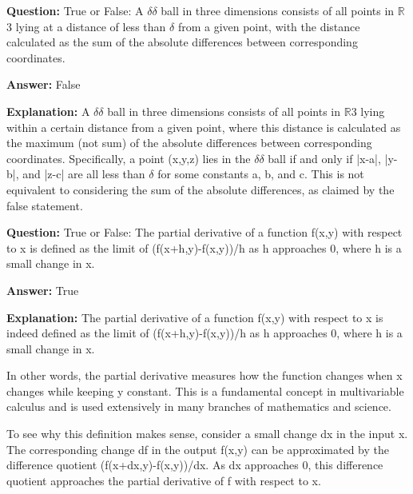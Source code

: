 \documentclass{article}
\begin{document}
                \vspace{0.5cm} 
        
            
                \textbf {Question:} True or False: A \ensuremath{\delta}\ensuremath{\delta} ball in three dimensions consists of all points in \ensuremath{\mathbb{R}}3 lying at a distance of less than \ensuremath{\delta} from a given point, with the distance calculated as the sum of the absolute differences between corresponding coordinates.
                
                \textbf{Answer:} False

                \textbf{Explanation:} A \ensuremath{\delta}\ensuremath{\delta} ball in three dimensions consists of all points in \ensuremath{\mathbb{R}}3 lying within a certain distance from a given point, where this distance is calculated as the maximum (not sum) of the absolute differences between corresponding coordinates. Specifically, a point (x,y,z) lies in the \ensuremath{\delta}\ensuremath{\delta} ball if and only if |x-a|, |y-b|, and |z-c| are all less than \ensuremath{\delta} for some constants a, b, and c. This is not equivalent to considering the sum of the absolute differences, as claimed by the false statement.
                
                \vspace{0.5cm} 
        
            
                \textbf {Question:} True or False: The partial derivative of a function f(x,y) with respect to x is defined as the limit of (f(x+h,y)-f(x,y))/h as h approaches 0, where h is a small change in x.
                
                \textbf{Answer:} True

                \textbf{Explanation:} The partial derivative of a function f(x,y) with respect to x is indeed defined as the limit of (f(x+h,y)-f(x,y))/h as h approaches 0, where h is a small change in x.

In other words, the partial derivative measures how the function changes when x changes while keeping y constant. This is a fundamental concept in multivariable calculus and is used extensively in many branches of mathematics and science.

To see why this definition makes sense, consider a small change dx in the input x. The corresponding change df in the output f(x,y) can be approximated by the difference quotient (f(x+dx,y)-f(x,y))/dx. As dx approaches 0, this difference quotient approaches the partial derivative of f with respect to x.
\end{document}
